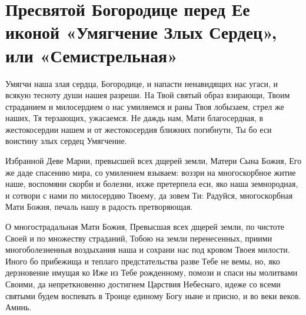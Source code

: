 \section{Пресвятой Богородице перед Ее иконой «Умягчение Злых Сердец», или  «Семистрельная»}\begin{mymulticols}
 


Умягчи наша злая сердца, Богородице, и напасти ненавидящих нас угаси, и всякую тесноту души нашея разреши. Hа Твой святый образ взирающи, Твоим страданием и милосердием о нас умиляемся и раны Твоя лобызаем, стрел же наших, Тя терзающих, ужасаемся. Не даждь нам, Мати благосердная, в жестокосердии нашем и от жестокосердия ближних погибнути, Ты бо еси воистину злых сердец Умягчение.


Избранной Деве Марии, превысшей всех дщерей земли, Матери Сына Божия, Его же даде спасению мира, со умилением взываем: воззри на многоскорбное житие наше, воспомяни скорби и болезни, ихже претерпела еси, яко наша земнородная, и сотвори с нами по милосердию Твоему, да зовем Ти: Радуйся, многоскорбная Мати Божия, печаль нашу в радость претворяющая.


О многострадальная Мати Божия, Превысшая всех дщерей земли, по чистоте Своей и по множеству страданий, Тобою на земли перенесенных, приими многоболезненныя воздыхания наша и сохрани нас под кровом Твоея милости. Иного бо прибежища и теплаго предстательства разве Тебе не вемы, но, яко дерзновение имущая ко Иже из Тебе рожденному, помози и спаси ны молитвами Своими, да непреткновенно достигнем Царствия Небеснаго, идеже со всеми святыми будем воспевать в Троице единому Богу ныне и присно, и во веки веков. Аминь.

\end{mymulticols}

\mychapterending


 

